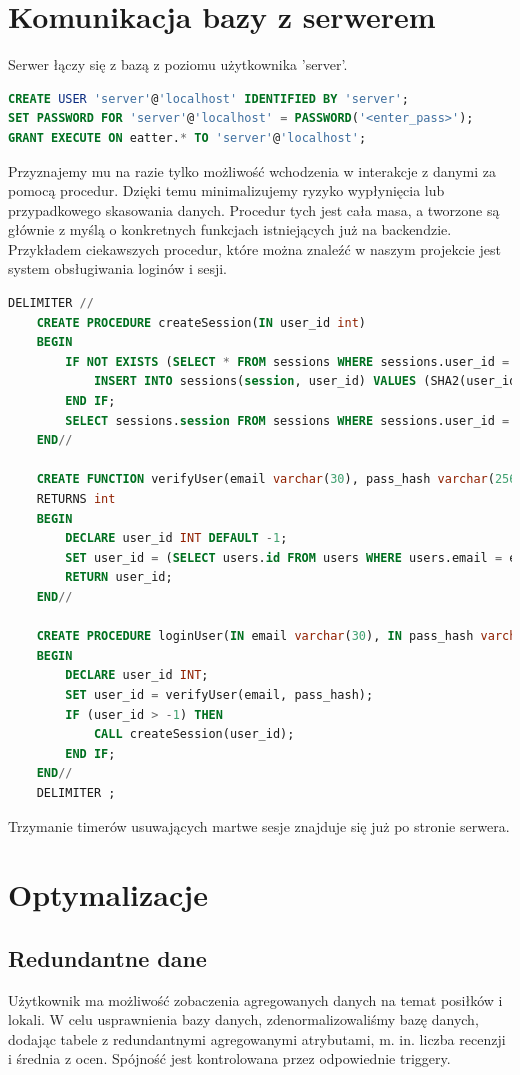 \documentclass{report}
\begin{document}
\section*{Komunikacja bazy z serwerem}
Serwer łączy się z bazą z poziomu użytkownika 'server'.
\begin{lstlisting}[language=SQL]
CREATE USER 'server'@'localhost' IDENTIFIED BY 'server';
SET PASSWORD FOR 'server'@'localhost' = PASSWORD('<enter_pass>');
GRANT EXECUTE ON eatter.* TO 'server'@'localhost';
\end{lstlisting}
Przyznajemy mu na razie tylko możliwość wchodzenia w interakcje z danymi
za pomocą procedur. Dzięki temu minimalizujemy ryzyko wypłynięcia lub
przypadkowego skasowania danych. Procedur tych jest cała masa, a tworzone
są głównie z myślą o konkretnych funkcjach istniejących już na backendzie.
Przykładem ciekawszych procedur, które można znaleźć w naszym projekcie
jest system obsługiwania loginów i sesji.
\begin{lstlisting}[language=SQL]
    DELIMITER //
    CREATE PROCEDURE createSession(IN user_id int)
    BEGIN
        IF NOT EXISTS (SELECT * FROM sessions WHERE sessions.user_id = user_id) THEN
            INSERT INTO sessions(session, user_id) VALUES (SHA2(user_id, 256), user_id);
        END IF;
        SELECT sessions.session FROM sessions WHERE sessions.user_id = user_id;
    END//

    CREATE FUNCTION verifyUser(email varchar(30), pass_hash varchar(256))
    RETURNS int
    BEGIN
        DECLARE user_id INT DEFAULT -1;
        SET user_id = (SELECT users.id FROM users WHERE users.email = email AND users.pass_hash = pass_hash);
        RETURN user_id;
    END//

    CREATE PROCEDURE loginUser(IN email varchar(30), IN pass_hash varchar(256))
    BEGIN
        DECLARE user_id INT;
        SET user_id = verifyUser(email, pass_hash);
        IF (user_id > -1) THEN
            CALL createSession(user_id);
        END IF;
    END//
    DELIMITER ;
\end{lstlisting}
Trzymanie timerów usuwających martwe sesje znajduje się już po stronie
serwera.
\section*{Optymalizacje}
\subsection*{Redundantne dane}
Użytkownik ma możliwość zobaczenia agregowanych danych 
na temat posiłków i lokali. W celu usprawnienia bazy danych,
zdenormalizowaliśmy bazę danych, dodając tabele z 
redundantnymi agregowanymi atrybutami, m. in. liczba recenzji
i średnia z ocen. Spójność jest kontrolowana przez odpowiednie triggery.
\end{document}
